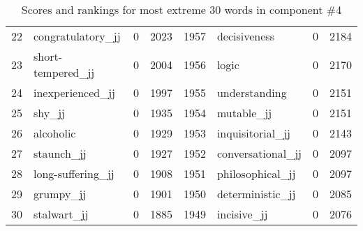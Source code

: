 \begin{table}[tbp]
\begin{tabular}{| rlr@{.}l | rlr@{.}l |}
    22 & congratulatory\_jj & 0 & 2023    &    1957 & decisiveness & 0 & 2184 \\
    23 & short-tempered\_jj & 0 & 2004    &    1956 & logic & 0 & 2170 \\
    24 & inexperienced\_jj & 0 & 1997    &    1955 & understanding & 0 & 2151 \\
    25 & shy\_jj & 0 & 1935    &    1954 & mutable\_jj & 0 & 2151 \\
    26 & alcoholic & 0 & 1929    &    1953 & inquisitorial\_jj & 0 & 2143 \\
    27 & staunch\_jj & 0 & 1927    &    1952 & conversational\_jj & 0 & 2097 \\
    28 & long-suffering\_jj & 0 & 1908    &    1951 & philosophical\_jj & 0 & 2097 \\
    29 & grumpy\_jj & 0 & 1901    &    1950 & deterministic\_jj & 0 & 2085 \\
    30 & stalwart\_jj & 0 & 1885    &    1949 & incisive\_jj & 0 & 2076 \\
    \hline
    \end{tabular}
    \caption{Scores and rankings for most extreme 30 words in component \#4} 
\end{table}
\clearpage
